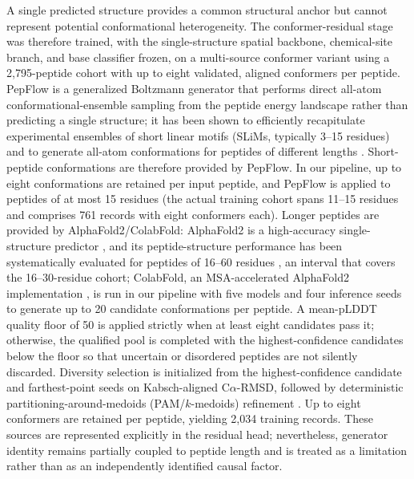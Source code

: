 \documentclass[12pt]{article}
\begin{document}
A single predicted structure provides a common structural anchor but cannot
represent potential conformational heterogeneity. The conformer-residual
stage was therefore trained, with the single-structure spatial backbone,
chemical-site branch, and base classifier frozen, on a multi-source conformer variant using a
2{,}795-peptide cohort with up to eight validated, aligned conformers per
peptide. PepFlow is a generalized Boltzmann generator that performs direct
all-atom conformational-ensemble sampling from the peptide energy landscape
rather than predicting a single structure; it has been shown to efficiently recapitulate
experimental ensembles of short linear motifs (SLiMs, typically 3--15
residues) and to generate all-atom conformations for peptides of different
lengths \cite{abdin2024pepflow}. Short-peptide conformations are therefore
provided by PepFlow. In our pipeline, up to eight conformations are retained
per input peptide, and PepFlow is applied to peptides of at most 15 residues
(the actual training cohort spans 11--15 residues and comprises 761 records
with eight conformers each). Longer peptides are provided by AlphaFold2/ColabFold:
AlphaFold2 is a high-accuracy single-structure predictor
\cite{jumper2021alphafold2}, and its peptide-structure performance has been
systematically evaluated for peptides of 16--60 residues
\cite{gulsevin2022benchmarking}, an interval that covers the 16--30-residue
cohort; ColabFold, an MSA-accelerated AlphaFold2 implementation
\cite{mirdita2022colabfold}, is run in our pipeline with five models and four
inference seeds to generate up to 20 candidate conformations per peptide. A
mean-pLDDT quality floor of 50 is applied strictly when at least eight
candidates pass it; otherwise, the qualified pool is completed with the
highest-confidence candidates below the floor so that uncertain or disordered
peptides are not silently discarded. Diversity selection is initialized from
the highest-confidence candidate and farthest-point seeds on Kabsch-aligned
C$\alpha$-RMSD, followed by deterministic partitioning-around-medoids
(PAM/$k$-medoids) refinement \cite{kabsch1976}. Up to eight conformers are
retained per peptide, yielding 2{,}034 training records. These sources are
represented explicitly in the residual
head; nevertheless, generator identity remains partially coupled to peptide
length and is treated as a limitation rather than as an independently
identified causal factor.
\end{document}
